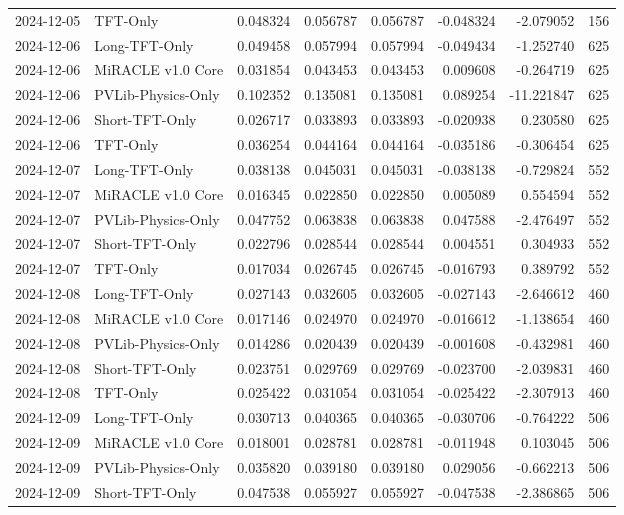 \begin{tabular}{llrrrrrr}
2024-12-05 & TFT-Only & 0.048324 & 0.056787 & 0.056787 & -0.048324 & -2.079052 & 156 \\
2024-12-06 & Long-TFT-Only & 0.049458 & 0.057994 & 0.057994 & -0.049434 & -1.252740 & 625 \\
2024-12-06 & MiRACLE v1.0 Core & 0.031854 & 0.043453 & 0.043453 & 0.009608 & -0.264719 & 625 \\
2024-12-06 & PVLib-Physics-Only & 0.102352 & 0.135081 & 0.135081 & 0.089254 & -11.221847 & 625 \\
2024-12-06 & Short-TFT-Only & 0.026717 & 0.033893 & 0.033893 & -0.020938 & 0.230580 & 625 \\
2024-12-06 & TFT-Only & 0.036254 & 0.044164 & 0.044164 & -0.035186 & -0.306454 & 625 \\
2024-12-07 & Long-TFT-Only & 0.038138 & 0.045031 & 0.045031 & -0.038138 & -0.729824 & 552 \\
2024-12-07 & MiRACLE v1.0 Core & 0.016345 & 0.022850 & 0.022850 & 0.005089 & 0.554594 & 552 \\
2024-12-07 & PVLib-Physics-Only & 0.047752 & 0.063838 & 0.063838 & 0.047588 & -2.476497 & 552 \\
2024-12-07 & Short-TFT-Only & 0.022796 & 0.028544 & 0.028544 & 0.004551 & 0.304933 & 552 \\
2024-12-07 & TFT-Only & 0.017034 & 0.026745 & 0.026745 & -0.016793 & 0.389792 & 552 \\
2024-12-08 & Long-TFT-Only & 0.027143 & 0.032605 & 0.032605 & -0.027143 & -2.646612 & 460 \\
2024-12-08 & MiRACLE v1.0 Core & 0.017146 & 0.024970 & 0.024970 & -0.016612 & -1.138654 & 460 \\
2024-12-08 & PVLib-Physics-Only & 0.014286 & 0.020439 & 0.020439 & -0.001608 & -0.432981 & 460 \\
2024-12-08 & Short-TFT-Only & 0.023751 & 0.029769 & 0.029769 & -0.023700 & -2.039831 & 460 \\
2024-12-08 & TFT-Only & 0.025422 & 0.031054 & 0.031054 & -0.025422 & -2.307913 & 460 \\
2024-12-09 & Long-TFT-Only & 0.030713 & 0.040365 & 0.040365 & -0.030706 & -0.764222 & 506 \\
2024-12-09 & MiRACLE v1.0 Core & 0.018001 & 0.028781 & 0.028781 & -0.011948 & 0.103045 & 506 \\
2024-12-09 & PVLib-Physics-Only & 0.035820 & 0.039180 & 0.039180 & 0.029056 & -0.662213 & 506 \\
2024-12-09 & Short-TFT-Only & 0.047538 & 0.055927 & 0.055927 & -0.047538 & -2.386865 & 506 \\

\end{tabular}

